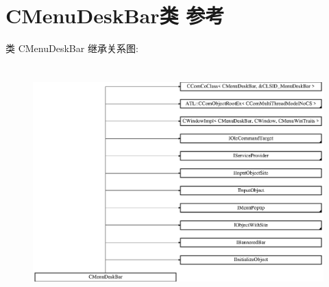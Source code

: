\hypertarget{class_c_menu_desk_bar}{}\section{C\+Menu\+Desk\+Bar类 参考}
\label{class_c_menu_desk_bar}
类 C\+Menu\+Desk\+Bar 继承关系图\+:\begin{figure}[H]
\begin{center}
\leavevmode
\includegraphics[height=9.032258cm]{class_c_menu_desk_bar}
\end{center}
\end{figure}
